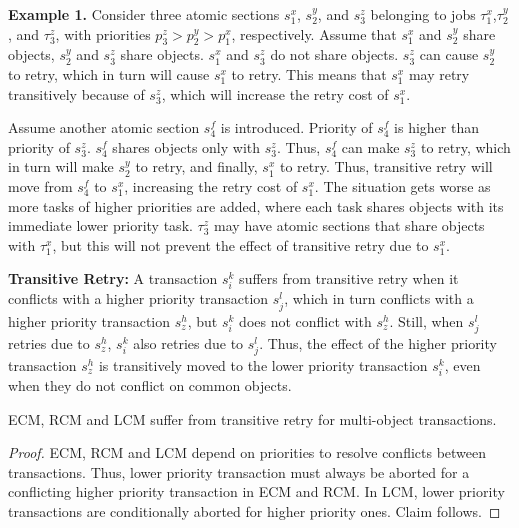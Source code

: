 \textbf{Example 1.} Consider three atomic sections $s_{1}^{x}$, $s_{2}^{y}$, 
and $s_{3}^{z}$ belonging to jobs $\tau_{1}^{x}$,$\tau_{2}^{y}$, 
and $\tau_{3}^{z}$, with priorities $p_{3}^{z}>p_{2}^{y}>p_{1}^{x}$, respectively. 
Assume that $s_{1}^{x}$ and $s_{2}^{y}$ share objects, $s_{2}^{y}$ and $s_{3}^{z}$
share objects. $s_{1}^{x}$ and $s_{3}^{z}$ do not share objects.
$s_{3}^{z}$ can cause $s_{2}^{y}$ to retry, which in turn will cause $s_{1}^{x}$ to retry. 
This means that $s_{1}^{x}$ may retry transitively
because of $s_{3}^{z}$, which will increase the retry cost of $s_{1}^{x}$.

Assume another atomic section $s_4^f$ is introduced. Priority of $s_4^f$ is higher than priority of $s_3^z$. $s_4^f$ shares objects only with $s_3^z$. Thus, $s_4^f$ can make $s_3^z$ to retry, which in turn will make $s_2^y$ to retry, and finally, $s_1^x$ to retry. Thus, transitive retry will move from $s_{4}^{f}$ to $s_{1}^{x}$, increasing the retry cost of $s_{1}^{x}$. 
The situation gets worse as more tasks of higher priorities are added, where each task
shares objects with its immediate lower priority task. $\tau_{3}^{z}$
may have atomic sections that share objects with $\tau_{1}^{x}$,
but this will not prevent the effect of transitive retry due to $s_{1}^{x}$.

\begin{mydef}
\textbf{Transitive Retry:} A transaction $s_{i}^{k}$ suffers from
transitive retry when it conflicts with a higher priority transaction
$s_{j}^{l}$, which in turn conflicts with a higher priority transaction
$s_{z}^{h}$, but $s_{i}^{k}$ does not conflict with $s_{z}^{h}$.
Still, when $s_{j}^{l}$ retries due to $s_{z}^{h}$, $s_{i}^{k}$
also retries due to $s_{j}^{l}$. Thus, the effect of the higher priority
transaction $s_{z}^{h}$ is transitively moved to the lower priority
transaction $s_{i}^{k}$, even when they do not conflict on common objects.
\end{mydef}

\begin{clm}\label{ecm-rcm-transitive-retry}
ECM, RCM and LCM suffer from transitive retry for multi-object transactions.
\end{clm}
\begin{proof}\normalfont
ECM, RCM and LCM depend on priorities to resolve conflicts between transactions. Thus, lower priority transaction must always be aborted for a conflicting higher priority transaction in ECM and RCM. In LCM, lower priority transactions are conditionally aborted for higher priority ones. Claim follows. 
\end{proof}

